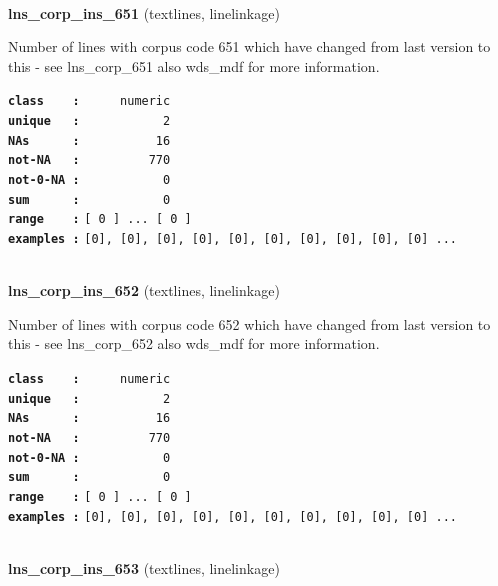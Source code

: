\documentclass[]{article}
\begin{document}
~

\textbf{lns\_corp\_ins\_651} (textlines, linelinkage)

Number of lines with corpus code 651 which have changed from last
version to this - see lns\_corp\_651 also wds\_mdf for more information.

\textbf{\texttt{class\ \ \ \ :}} \texttt{~~~~~numeric}\\
\textbf{\texttt{unique\ \ \ :}} \texttt{~~~~~~~~~~~2}\\
\textbf{\texttt{NAs\ \ \ \ \ \ :}} \texttt{~~~~~~~~~~16}\\
\textbf{\texttt{not-NA\ \ \ :}} \texttt{~~~~~~~~~770}\\
\textbf{\texttt{not-0-NA\ :}} \texttt{~~~~~~~~~~~0}\\
\textbf{\texttt{sum\ \ \ \ \ \ :}} \texttt{~~~~~~~~~~~0}\\
\textbf{\texttt{range\ \ \ \ :}}
\texttt{{[}\ 0\ {]}\ ...\ {[}\ 0\ {]}}\\
\textbf{\texttt{examples\ :}}
\texttt{{[}0{]},\ {[}0{]},\ {[}0{]},\ {[}0{]},\ {[}0{]},\ {[}0{]},\ {[}0{]},\ {[}0{]},\ {[}0{]},\ {[}0{]}\ ...}\\

~

\textbf{lns\_corp\_ins\_652} (textlines, linelinkage)

Number of lines with corpus code 652 which have changed from last
version to this - see lns\_corp\_652 also wds\_mdf for more information.

\textbf{\texttt{class\ \ \ \ :}} \texttt{~~~~~numeric}\\
\textbf{\texttt{unique\ \ \ :}} \texttt{~~~~~~~~~~~2}\\
\textbf{\texttt{NAs\ \ \ \ \ \ :}} \texttt{~~~~~~~~~~16}\\
\textbf{\texttt{not-NA\ \ \ :}} \texttt{~~~~~~~~~770}\\
\textbf{\texttt{not-0-NA\ :}} \texttt{~~~~~~~~~~~0}\\
\textbf{\texttt{sum\ \ \ \ \ \ :}} \texttt{~~~~~~~~~~~0}\\
\textbf{\texttt{range\ \ \ \ :}}
\texttt{{[}\ 0\ {]}\ ...\ {[}\ 0\ {]}}\\
\textbf{\texttt{examples\ :}}
\texttt{{[}0{]},\ {[}0{]},\ {[}0{]},\ {[}0{]},\ {[}0{]},\ {[}0{]},\ {[}0{]},\ {[}0{]},\ {[}0{]},\ {[}0{]}\ ...}\\

~

\textbf{lns\_corp\_ins\_653} (textlines, linelinkage)
\end{document}
